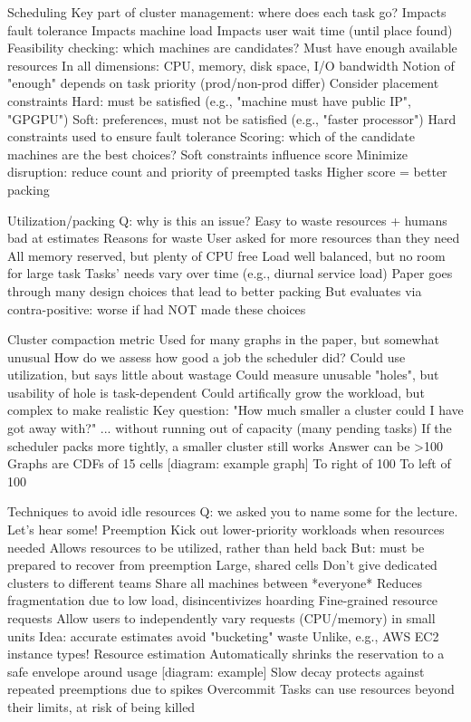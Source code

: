 Scheduling
  Key part of cluster management: where does each task go?
    Impacts fault tolerance
    Impacts machine load
    Impacts user wait time (until place found)
  Feasibility checking: which machines are candidates?
    Must have enough available resources
      In all dimensions: CPU, memory, disk space, I/O bandwidth
      Notion of "enough" depends on task priority (prod/non-prod differ)
    Consider placement constraints
      Hard: must be satisfied (e.g., "machine must have public IP", "GPGPU")
      Soft: preferences, must not be satisfied (e.g., "faster processor")
      Hard constraints used to ensure fault tolerance 
  Scoring: which of the candidate machines are the best choices?
    Soft constraints influence score
    Minimize disruption: reduce count and priority of preempted tasks
    Higher score = better packing

Utilization/packing
  Q: why is this an issue? Easy to waste resources + humans bad at estimates
  Reasons for waste
    User asked for more resources than they need
    All memory reserved, but plenty of CPU free
    Load well balanced, but no room for large task
    Tasks' needs vary over time (e.g., diurnal service load)
  Paper goes through many design choices that lead to better packing
    But evaluates via contra-positive: worse if had NOT made these choices

Cluster compaction metric
  Used for many graphs in the paper, but somewhat unusual
  How do we assess how good a job the scheduler did?
    Could use utilization, but says little about wastage
    Could measure unusable "holes", but usability of hole is task-dependent
    Could artifically grow the workload, but complex to make realistic
  Key question: "How much smaller a cluster could I have got away with?"
    ... without running out of capacity (many pending tasks)
    If the scheduler packs more tightly, a smaller cluster still works
    Answer can be >100%
  Graphs are CDFs of 15 cells
    [diagram: example graph]
    To right of 100%
    To left of 100%

Techniques to avoid idle resources
  Q: we asked you to name some for the lecture. Let's hear some!
  Preemption
    Kick out lower-priority workloads when resources needed
    Allows resources to be utilized, rather than held back
    But: must be prepared to recover from preemption
  Large, shared cells
    Don't give dedicated clusters to different teams
    Share all machines between *everyone*
    Reduces fragmentation due to low load, disincentivizes hoarding
  Fine-grained resource requests
    Allow users to independently vary requests (CPU/memory) in small units
    Idea: accurate estimates avoid "bucketing" waste
    Unlike, e.g., AWS EC2 instance types!
  Resource estimation
    Automatically shrinks the reservation to a safe envelope around usage
    [diagram: example]
    Slow decay protects against repeated preemptions due to spikes
  Overcommit
    Tasks can use resources beyond their limits, at risk of being killed

